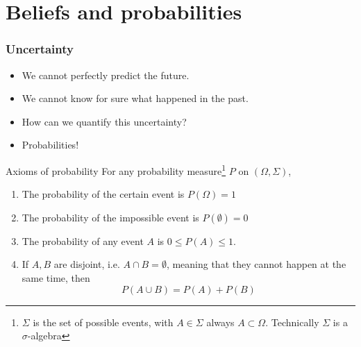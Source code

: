 \section{Beliefs and probabilities}



\begin{frame}
  \frametitle{Uncertainty}
  \begin{itemize}
  \item We cannot perfectly predict the future.
  \item We cannot know for sure what happened in the past.
  \item How can we quantify this uncertainty?
  \item Probabilities!
  \end{itemize}
  \begin{block}{Axioms of probability}
    For any probability measure\footnote{$\Sigma$ is the set of possible events, with $A \in \Sigma$ always $A \subset \Omega$. Technically $\Sigma$ is a $\sigma$-algebra} $P$ on $(\Omega, \Sigma)$,
    \begin{enumerate}
    \item<2-> The probability of the certain event is $P(\Omega) = 1$
    \item<3->The probability of the impossible event is
      $P(\emptyset) = 0$
    \item<4->The probability of any event $A$ is $0 \leq P(A) \leq 1$.
    \item<5-> If $A, B$ are disjoint, i.e. $A \cap B = \emptyset$, meaning
      that they cannot happen at the same time, then
      \[
      P(A \cup B) = P(A) + P(B)
      \]
    \end{enumerate}
  \end{block}
\end{frame}

